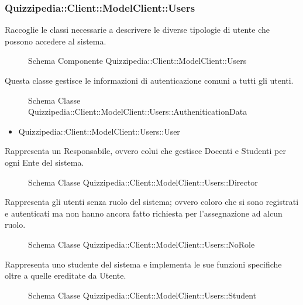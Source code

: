 \subsubsection{Quizzipedia::Client::ModelClient::Users}
Raccoglie le classi necessarie a descrivere le diverse tipologie di utente che possono accedere al sistema.
\begin{figure}[H]
\centering
\noindent{}
\caption{Schema Componente Quizzipedia::Client::ModelClient::Users}
\end{figure}
Questa classe gestisce le informazioni di autenticazione comuni a tutti gli utenti.
\begin{figure}[H]
\centering
\noindent{}
\caption{Schema Classe Quizzipedia::Client::ModelClient::Users::AutheniticationData}
\end{figure}
\begin{itemize}
\item Quizzipedia::Client::ModelClient::Users::User
\end{itemize}
Rappresenta un Responsabile, ovvero colui che gestisce Docenti e Studenti per ogni Ente del sistema.
\begin{figure}[H]
\centering
\noindent{}
\caption{Schema Classe Quizzipedia::Client::ModelClient::Users::Director}
\end{figure}
Rappresenta gli utenti senza ruolo del sistema; ovvero coloro che si sono registrati e autenticati ma non hanno ancora fatto richiesta per l'assegnazione ad alcun ruolo.
\begin{figure}[H]
\centering
\noindent{}
\caption{Schema Classe Quizzipedia::Client::ModelClient::Users::NoRole}
\end{figure}
Rappresenta uno studente del sistema e implementa le sue funzioni specifiche oltre a quelle ereditate da Utente.
\begin{figure}[H]
\centering
\noindent{}
\caption{Schema Classe Quizzipedia::Client::ModelClient::Users::Student}
\end{figure}
